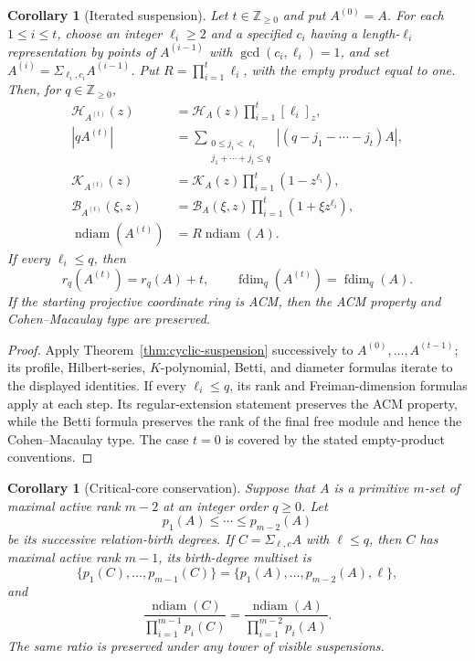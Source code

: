 \documentclass[11pt,reqno]{amsart}
\newtheorem{corollary}[theorem]{Corollary}
\theoremstyle{definition}
\theoremstyle{remark}
\newcommand{\ndiam}{\operatorname{ndiam}}
\begin{document}
\begin{corollary}[Iterated suspension]
\label{cor:iterated-suspension}
Let $t\in\mathbb Z_{\geq0}$ and put $A^{(0)}=A$.  For each $1\leq i\leq t$, choose an
integer $\ell_i\geq2$ and a specified $c_i$ having a length-$\ell_i$
representation by points of $A^{(i-1)}$ with $\gcd(c_i,\ell_i)=1$, and set
$A^{(i)}=\Sigma_{\ell_i,c_i}A^{(i-1)}$.  Put
$R=\prod_{i=1}^t\ell_i$, with the empty product equal to one.  Then, for
$q\in\mathbb Z_{\geq0}$,
\begin{align}
 \mathcal H_{A^{(t)}}(z)
 &=\mathcal H_A(z)\prod_{i=1}^t[\ell_i]_z,
 \label{eq:iterated-suspension-H}\\
 |qA^{(t)}|
 &=\sum_{\substack{0\leq j_i<\ell_i\\
                    j_1+\cdots+j_t\leq q}}
   |(q-j_1-\cdots-j_t)A|,
 \label{eq:iterated-suspension-profile}\\
 \mathcal K_{A^{(t)}}(z)
 &=\mathcal K_A(z)\prod_{i=1}^t(1-z^{\ell_i}),
 \label{eq:iterated-suspension-K}\\
 \mathcal B_{A^{(t)}}(\xi,z)
 &=\mathcal B_A(\xi,z)\prod_{i=1}^t(1+\xi z^{\ell_i}),
 \label{eq:iterated-suspension-Betti}\\
 \ndiam(A^{(t)})&=R\ndiam(A).
 \label{eq:iterated-suspension-diameter}
\end{align}
If every $\ell_i\leq q$, then
\[
 r_q(A^{(t)})=r_q(A)+t,\qquad
 \operatorname{fdim}_q(A^{(t)})=\operatorname{fdim}_q(A).
\]
If the starting projective coordinate ring is ACM, then the ACM property
and Cohen--Macaulay type are preserved.
\end{corollary}

\begin{proof}
Apply Theorem~\ref{thm:cyclic-suspension} successively to
$A^{(0)},\ldots,A^{(t-1)}$; its profile, Hilbert-series,
$K$-polynomial, Betti, and diameter formulas iterate to the displayed
identities.  If every $\ell_i\leq q$, its rank and Freiman-dimension
formulas apply at each step.  Its regular-extension statement preserves
the ACM property, while the Betti formula preserves the rank of the final free
module and hence the Cohen--Macaulay type.  The case $t=0$ is covered by
the stated empty-product conventions.
\end{proof}

\begin{corollary}[Critical-core conservation]
\label{cor:suspension-critical-core}
Suppose that $A$ is a primitive $m$-set of maximal active rank $m-2$ at an
integer order $q\geq0$.  Let
\[
 p_1(A)\leq\cdots\leq p_{m-2}(A)
\]
be its successive relation-birth degrees.  If $C=\Sigma_{\ell,c}A$ with
$\ell\leq q$, then $C$ has maximal active rank $m-1$, its birth-degree
multiset is
\[
 \{p_1(C),\ldots,p_{m-1}(C)\}
 =\{p_1(A),\ldots,p_{m-2}(A),\ell\},
\]
and
\begin{equation}\label{eq:critical-core-conservation}
 \frac{\ndiam(C)}{\prod_{i=1}^{m-1}p_i(C)}
 =
 \frac{\ndiam(A)}{\prod_{i=1}^{m-2}p_i(A)}.
\end{equation}
The same ratio is preserved under any tower of visible suspensions.
\end{corollary}
\end{document}
